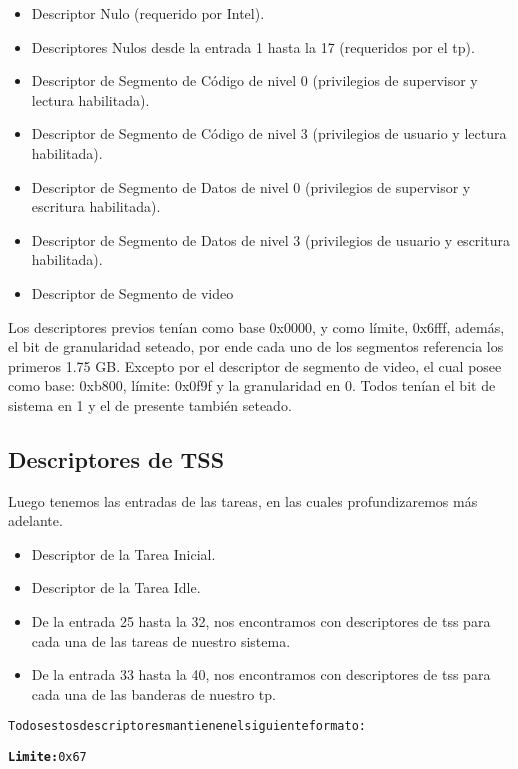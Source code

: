 \par{
\begin{itemize}
\item Descriptor Nulo (requerido por Intel).
\item Descriptores Nulos desde la entrada 1 hasta la 17 (requeridos por el tp).
\item Descriptor de Segmento de Código de nivel 0 (privilegios de supervisor y lectura habilitada).
\item Descriptor de Segmento de Código de nivel 3 (privilegios de usuario y lectura habilitada).
\item Descriptor de Segmento de Datos de nivel 0 (privilegios de supervisor y escritura habilitada).
\item Descriptor de Segmento de Datos de nivel 3 (privilegios de usuario y escritura habilitada).
\item Descriptor de Segmento de video 
\end{itemize}
\medskip
\par{Los descriptores previos tenían como base 0x0000, y como límite, 0x6fff, además, el bit de granularidad seteado, por ende cada uno de los segmentos referencia los primeros 1.75 GB. Excepto por el descriptor de segmento de video, el cual posee como base: 0xb800, límite: 0x0f9f y la granularidad en 0.
Todos tenían el bit de sistema en 1 y el de presente también seteado.
}
\medskip

\subsection{Descriptores de TSS}
Luego tenemos las entradas de las tareas, en las cuales profundizaremos más adelante.
\begin{itemize}
\item Descriptor de la Tarea Inicial.
\item Descriptor de la Tarea Idle.
\item De la entrada 25 hasta la 32, nos encontramos con descriptores de tss para cada una de las tareas de nuestro sistema.
\item De la entrada 33 hasta la 40, nos encontramos con descriptores de tss para cada una de las banderas de nuestro tp.
\end{itemize}


\begin{alltt}
\normalfont
		       Todos estos descriptores mantienen el siguiente formato:
		       
         \textbf{Limite:} 0x67
			   

\end{alltt}}

